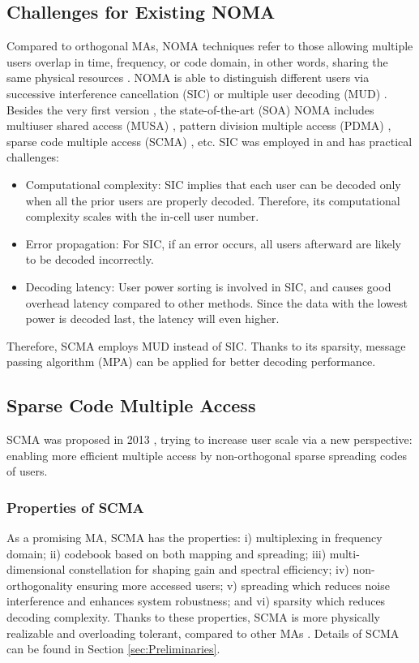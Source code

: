\documentclass[journal,twoside]{IEEEtran}
\begin{document}
\subsection{Challenges for Existing NOMA}
Compared to orthogonal MAs, NOMA techniques refer to those allowing multiple users overlap in time, frequency, or code domain, in other words, sharing the same physical resources \cite{NOMA_intro}. NOMA is able to distinguish different users via successive interference cancellation (SIC) \cite{SIC} or multiple user decoding (MUD) \cite{MUD}. Besides the very first version \cite{NOMA_detail}, the state-of-the-art (SOA) NOMA includes multiuser shared access (MUSA) \cite{MUSA_detail}, pattern division multiple access (PDMA) \cite{PDMA_detail}, sparse code multiple access (SCMA) \cite{nikopour2013sparse}, etc. SIC was employed in \cite{NOMA_detail,MUSA_detail,PDMA_detail} and has practical challenges:
\begin{itemize}
  \item Computational complexity: SIC implies that each user can be decoded only when all the prior users are properly decoded. Therefore, its computational complexity scales with the in-cell user number.
  \item Error propagation: For SIC, if an error occurs, all users afterward are likely to be decoded incorrectly.
  \item Decoding latency: User power sorting is involved in SIC, and causes good overhead latency compared to other methods. Since the data with the lowest power is decoded last, the latency will even higher.
\end{itemize}
Therefore, SCMA employs MUD instead of SIC. Thanks to its sparsity, message passing algorithm (MPA) can be applied for better decoding performance.

\subsection{Sparse Code Multiple Access}
SCMA was proposed in 2013 \cite{nikopour2013sparse}, trying to increase user scale via a new perspective: enabling more efficient multiple access by non-orthogonal sparse spreading codes of users.

\subsubsection{Properties of SCMA}
As a promising MA, SCMA has the properties: i) multiplexing in frequency domain; ii) codebook based on both mapping and spreading; iii) multi-dimensional constellation for shaping gain and spectral efficiency; iv) non-orthogonality ensuring more accessed users; v) spreading which reduces noise interference and enhances system robustness; and vi) sparsity which reduces decoding complexity. Thanks to these properties, SCMA is more physically realizable and overloading tolerant, compared to other MAs \cite{nikopour2014scma}. Details of SCMA can be found in Section \ref{sec:Preliminaries}.
\end{document}
